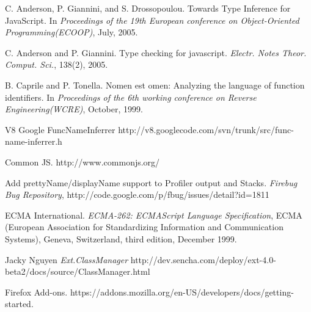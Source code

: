 \documentclass[10pt, preprint]{sigplanconf}
\begin{document}



%



\begin{thebibliography}{}
\softraggedright


C. Anderson, P. Giannini, and S. Drossopoulou. \newblock Towards Type Inference for JavaScript.
\newblock In \emph{Proceedings of the 19th European conference on Object-Oriented Programming(ECOOP)},
July, 2005.

C. Anderson and P. Giannini. \newblock Type checking for javascript.
\newblock \emph{Electr. Notes Theor. Comput. Sci.}, 138(2), 2005. 

B. Caprile and P. Tonella. \newblock Nomen est omen: Analyzing the language of function identifiers.
\newblock In \emph{Proceedings of the 6th working conference on Reverse Engineering(WCRE)},
October, 1999.

V8 Google FuncNameInferrer 
\newblock http://v8.googlecode.com/svn/trunk/src/func-name-inferrer.h

Common JS.
\newblock http://www.commonjs.org/

Add prettyName/displayName support to Profiler output and Stacks.
\newblock \emph{Firebug Bug Repository},
\newblock http://code.google.com/p/fbug/issues/detail?id=1811

ECMA International.
\newblock \emph{ECMA-262: ECMAScript Language Specification},
ECMA (European Association for Standardizing Information
and Communication Systems), Geneva, Switzerland, third edition,
December 1999. 

Jacky Nguyen
\newblock \emph{Ext.ClassManager}
\newblock http://dev.sencha.com/deploy/ext-4.0-beta2/docs/source/ClassManager.html

Firefox Add-ons.
\newblock https://addons.mozilla.org/en-US/developers/docs/getting-started.


\end{thebibliography}
\end{document}
